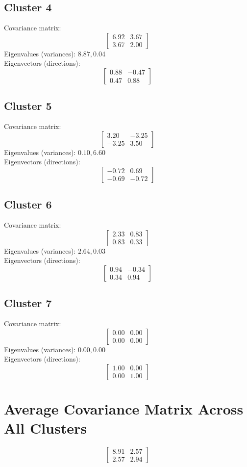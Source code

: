 \documentclass{article}
\begin{document}
\subsection*{Cluster 4}
Covariance matrix:
\[\begin{bmatrix}6.92 & 3.67 \\3.67 & 2.00\end{bmatrix}\]
Eigenvalues (variances): $ 8.87, $0.04\\
Eigenvectors (directions):
\[\begin{bmatrix}0.88 & -0.47 \\0.47 & 0.88\end{bmatrix}\]
\subsection*{Cluster 5}
Covariance matrix:
\[\begin{bmatrix}3.20 & -3.25 \\-3.25 & 3.50\end{bmatrix}\]
Eigenvalues (variances): $ 0.10, $6.60\\
Eigenvectors (directions):
\[\begin{bmatrix}-0.72 & 0.69 \\-0.69 & -0.72\end{bmatrix}\]
\subsection*{Cluster 6}
Covariance matrix:
\[\begin{bmatrix}2.33 & 0.83 \\0.83 & 0.33\end{bmatrix}\]
Eigenvalues (variances): $ 2.64, $0.03\\
Eigenvectors (directions):
\[\begin{bmatrix}0.94 & -0.34 \\0.34 & 0.94\end{bmatrix}\]
\subsection*{Cluster 7}
Covariance matrix:
\[\begin{bmatrix}0.00 & 0.00 \\0.00 & 0.00\end{bmatrix}\]
Eigenvalues (variances): $ 0.00, $0.00\\
Eigenvectors (directions):
\[\begin{bmatrix}1.00 & 0.00 \\0.00 & 1.00\end{bmatrix}\]
\section*{Average Covariance Matrix Across All Clusters}
\[\begin{bmatrix}8.91 & 2.57 \\2.57 & 2.94\end{bmatrix}\]
\end{document}
